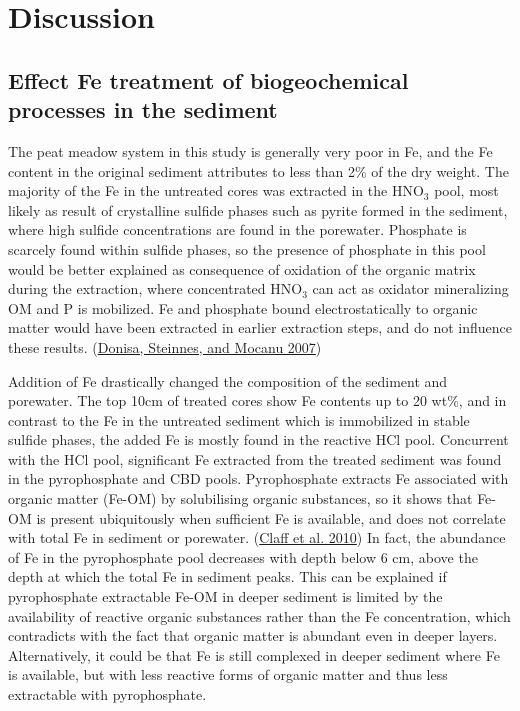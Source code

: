 \documentclass[a4paper,11pt]{article}
\begin{document}
\hypertarget{discussion}{%
\section{Discussion}\label{discussion}}

\hypertarget{effect-fe-treatment-of-biogeochemical-processes-in-the-sediment}{%
\subsection{Effect Fe treatment of biogeochemical processes in the sediment}\label{effect-fe-treatment-of-biogeochemical-processes-in-the-sediment}}

The peat meadow system in this study is generally very poor in Fe, and the Fe content in the original sediment attributes to less than 2\% of the dry weight. The majority of the Fe in the untreated cores was extracted in the HNO\(_3\) pool, most likely as result of crystalline sulfide phases such as pyrite formed in the sediment, where high sulfide concentrations are found in the porewater. Phosphate is scarcely found within sulfide phases, so the presence of phosphate in this pool would be better explained as consequence of oxidation of the organic matrix during the extraction, where concentrated HNO\(_3\) can act as oxidator mineralizing OM and P is mobilized. Fe and phosphate bound electrostatically to organic matter would have been extracted in earlier extraction steps, and do not influence these results. (\protect\hyperlink{ref-donisaCombinationDiferrentExtractants2007}{Donisa, Steinnes, and Mocanu 2007})

Addition of Fe drastically changed the composition of the sediment and porewater. The top 10cm of treated cores show Fe contents up to 20 wt\%, and in contrast to the Fe in the untreated sediment which is immobilized in stable sulfide phases, the added Fe is mostly found in the reactive HCl pool. Concurrent with the HCl pool, significant Fe extracted from the treated sediment was found in the pyrophosphate and CBD pools. Pyrophosphate extracts Fe associated with organic matter (Fe-OM) by solubilising organic substances, so it shows that Fe-OM is present ubiquitously when sufficient Fe is available, and does not correlate with total Fe in sediment or porewater. (\protect\hyperlink{ref-claffSequentialExtractionProcedure2010}{Claff et al. 2010}) In fact, the abundance of Fe in the pyrophosphate pool decreases with depth below 6 cm, above the depth at which the total Fe in sediment peaks. This can be explained if pyrophosphate extractable Fe-OM in deeper sediment is limited by the availability of reactive organic substances rather than the Fe concentration, which contradicts with the fact that organic matter is abundant even in deeper layers. Alternatively, it could be that Fe is still complexed in deeper sediment where Fe is available, but with less reactive forms of organic matter and thus less extractable with pyrophosphate.
\end{document}

